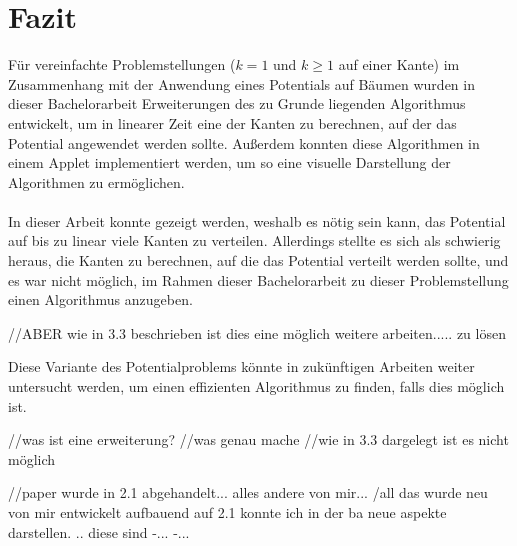 \section{Fazit}


Für vereinfachte Problemstellungen ($k = 1$ und $k \geq 1$ auf einer Kante) im Zusammenhang mit der Anwendung eines Potentials auf Bäumen wurden in dieser Bachelorarbeit Erweiterungen des zu Grunde liegenden Algorithmus entwickelt, um in linearer Zeit eine der Kanten zu berechnen, auf der das Potential angewendet werden sollte. Außerdem konnten diese Algorithmen in einem Applet implementiert werden, um so eine visuelle Darstellung der Algorithmen zu ermöglichen.
\\
\\
In dieser Arbeit konnte gezeigt werden, weshalb es nötig sein kann, das Potential auf bis zu linear viele Kanten zu verteilen. Allerdings stellte es sich als schwierig heraus, die Kanten zu berechnen, auf die das Potential verteilt werden sollte, und es war nicht möglich, im Rahmen dieser Bachelorarbeit zu dieser Problemstellung einen Algorithmus anzugeben.

//ABER wie in 3.3 beschrieben ist dies eine möglich weitere arbeiten..... zu lösen

 Diese Variante des Potentialproblems könnte in zukünftigen Arbeiten weiter untersucht werden, um einen effizienten Algorithmus zu finden, falls dies möglich ist.


//was ist eine erweiterung?
//was genau mache
//wie in 3.3 dargelegt ist es nicht möglich

//paper wurde in 2.1 abgehandelt... alles andere von mir...
/all das wurde neu von mir entwickelt
aufbauend auf 2.1 konnte ich in der ba neue aspekte darstellen. .. diese sind
-...
-...

